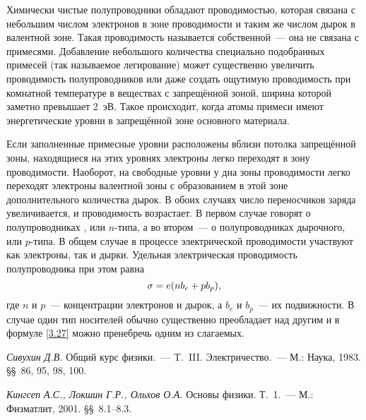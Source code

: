 Химически чистые полупроводники обладают проводимостью, которая связана с небольшим числом электронов в зоне
проводимости и таким же числом дырок в валентной зоне. Такая проводимость называется собственной~--- она не связана с примесями. Добавление небольшого количества специально подобранных примесей (так называемое
легирование) может существенно увеличить проводимость полупроводников или даже создать ощутимую проводимость при комнатной температуре в веществах с запрещённой зоной, ширина которой заметно превышает 2~эВ. Такое происходит, когда атомы примеси имеют энергетические уровни в запрещённой зоне основного материала.

Если заполненные примесные уровни расположены вблизи потолка запрещённой зоны, находящиеся на этих уровнях электроны легко переходят в зону проводимости. Наоборот, на свободные уровни у дна зоны проводимости легко переходят электроны валентной зоны с образованием в этой зоне дополнительного количества дырок. В обоих случаях число переносчиков заряда увеличивается, и проводимость возрастает. В первом случае говорят о полупроводниках , или $n$-типа, а во втором~--- о  полупроводниках дырочного, или $p$-типа. В общем случае в процессе электрической проводимости участвуют как электроны, так и дырки. Удельная электрическая проводимость полупроводника при этом равна
\begin{equation}
	\eqmark{3.27}
	\sigma=e(nb_e+pb_p),
\end{equation}
где $n$ и $p$~--- концентрации электронов и дырок, а $b_e$ и $b_p$~--- их подвижности. В случае  один тип носителей обычно существенно преобладает над другим и в формуле \eqref{3.27} можно пренебречь одним из слагаемых.



\begin{lab:literature}
	\item{ \emph{Сивухин Д.В.} Общий курс физики.~--- T.~III. Электричество.~--- М.: Наука, 1983. \S\S~86, 95, 98, 100.}
	\item{ \emph{Кингсеп А.С., Локшин Г.Р., Ольхов О.А.} Основы физики. Т.~1.~--- М.: Физматлит, 2001. \S\S~8.1--8.3.}
\end{lab:literature}


